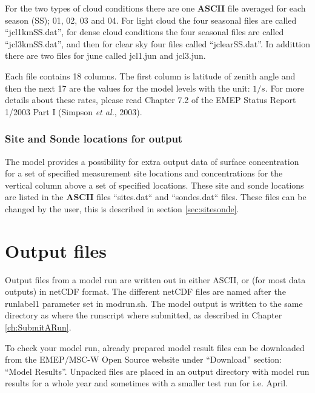 \documentclass[a4paper,12pt]{report}
\begin{document}
For the two types of cloud conditions there are one {\bf ASCII} file 
averaged for each season (SS); 01, 02, 03 and 04. 
For light cloud the four seasonal files are called ``jcl1kmSS.dat'', for dense cloud conditions
the four seasonal files are called ``jcl3kmSS.dat'', and then for clear sky four files 
called ``jclearSS.dat''. In addittion there are two files for june called jcl1.jun 
and jcl3.jun.

Each file contains 18 columns. The first column is latitude of zenith 
angle and then the
next 17 are the values for the model levels with the unit: $1/s$. 
For more details about these rates, please read Chapter 7.2 of the EMEP
Status Report 1/2003 Part I (Simpson {\sl et al.}, 2003).


\subsection{Site and Sonde locations for output}\label{sec:sitessondes_input}
The model provides a possibility for extra output data of surface concentration 
for a set of specified measurement site locations and concentrations for the vertical 
column above a set of specified locations. These site and sonde locations are listed 
in the {\bf ASCII} files ``sites.dat`` and ``sondes.dat`` files. These files can be 
changed by the user, this is described in section \ref{sec:sitesonde}.
\chapter{Output files}
\label{ch:output}

Output files from a model run are written out in either ASCII, or
(for most data outputs) in netCDF format. 
The different netCDF files are named after the runlabel1 parameter set in 
modrun.sh. 
The model output is written to the same directory as where the runscript 
where submitted, as described in Chapter \ref{ch:SubmitARun}.

To check your model run, already prepared model result files can be 
downloaded from the EMEP/MSC-W Open Source website under 
``Download'' section: ``Model Results''. Unpacked files are placed in
an output directory with model run results for a whole year and sometimes 
with a smaller test run for i.e. April. 
\end{document}
